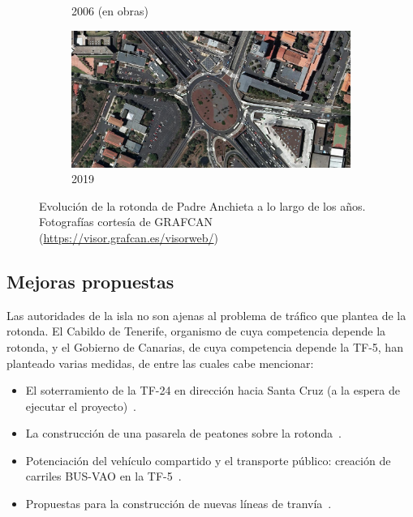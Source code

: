 \begin{figure}[h]
\begin{subfigure}[t]{.49\textwidth}
      \caption{2006 (en obras)}
      \label{fig:anchieta2006}
    \end{subfigure}
    \hfill
    \begin{subfigure}[t]{.49\textwidth}
      \centering
      \includegraphics[width=\textwidth]{report/images/amp-anchieta-2019.png}
      \caption{2019}
      \label{fig:anchieta2019}
    \end{subfigure}
    \caption{Evolución de la rotonda de Padre Anchieta a lo largo de los años. Fotografías cortesía de GRAFCAN (\url{https://visor.grafcan.es/visorweb/})}
    \label{fig:anchieta_ev}
\end{figure}

\subsection{Mejoras propuestas}

Las autoridades de la isla no son ajenas al problema de tráfico que plantea de la rotonda. El Cabildo de Tenerife, organismo de cuya competencia depende la rotonda, y el Gobierno de Canarias, de cuya competencia depende la TF-5, han planteado varias medidas, de entre las cuales cabe mencionar:

\begin{itemize}
    \item El soterramiento de la TF-24 en dirección hacia Santa Cruz (a la espera de ejecutar el proyecto)~\cite{dia_cabildo_2019}.
    \item La construcción de una pasarela de peatones sobre la rotonda~\cite{rozas_pasarela_2019}.
    \item Potenciación del vehículo compartido y el transporte público: creación de carriles BUS-VAO en la TF-5~\cite{20minutos_gobierno_2019}.
    \item Propuestas para la construcción de nuevas líneas de tranvía~\cite{redaccion_de_eldiarioes_cabildo_2020}.
\end{itemize}

